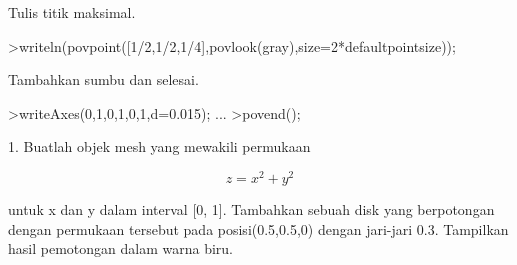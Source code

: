 \documentclass{article}
\begin{document}
\begin{eulernotebook}
\begin{eulercomment}
\begin{eulercomment}
\begin{eulercomment}
\begin{eulercomment}
\begin{eulercomment}
\begin{eulercomment}
\begin{eulercomment}
\begin{eulercomment}
\begin{eulercomment}
\begin{eulercomment}
\begin{eulercomment}
\begin{eulercomment}
\begin{eulercomment}
\begin{eulercomment}
\begin{eulercomment}
\begin{eulercomment}
\begin{eulercomment}
\begin{eulercomment}
\begin{eulercomment}
\begin{eulercomment}
\begin{eulercomment}
\begin{eulercomment}
\begin{eulercomment}
\begin{eulercomment}
\begin{eulercomment}
\begin{eulercomment}
\begin{eulercomment}
\begin{eulercomment}
\begin{eulercomment}
Tulis titik maksimal.
\end{eulercomment}
\begin{eulerprompt}
>writeln(povpoint([1/2,1/2,1/4],povlook(gray),size=2*defaultpointsize));
\end{eulerprompt}
\begin{eulercomment}
Tambahkan sumbu dan selesai.
\end{eulercomment}
\begin{eulerprompt}
>writeAxes(0,1,0,1,0,1,d=0.015); ...
>povend();
\end{eulerprompt}
\eulersubheading{}
\begin{eulercomment}
\end{eulercomment}
\begin{eulercomment}
1. Buatlah objek mesh yang mewakili permukaan\\
\end{eulercomment}
\begin{eulerformula}
\[
z=x^2+y^2
\]
\end{eulerformula}
\begin{eulercomment}
untuk x dan y dalam interval [0, 1]. Tambahkan sebuah disk yang
berpotongan dengan permukaan tersebut pada posisi(0.5,0.5,0) dengan
jari-jari 0.3. Tampilkan hasil pemotongan dalam warna biru.


\end{eulercomment}
\end{eulercomment}
\end{eulercomment}
\end{eulercomment}
\end{eulercomment}
\end{eulercomment}
\end{eulercomment}
\end{eulercomment}
\end{eulercomment}
\end{eulercomment}
\end{eulercomment}
\end{eulercomment}
\end{eulercomment}
\end{eulercomment}
\end{eulercomment}
\end{eulercomment}
\end{eulercomment}
\end{eulercomment}
\end{eulercomment}
\end{eulercomment}
\end{eulercomment}
\end{eulercomment}
\end{eulercomment}
\end{eulercomment}
\end{eulercomment}
\end{eulercomment}
\end{eulercomment}
\end{eulercomment}
\end{eulercomment}
\end{eulernotebook}
\end{document}
